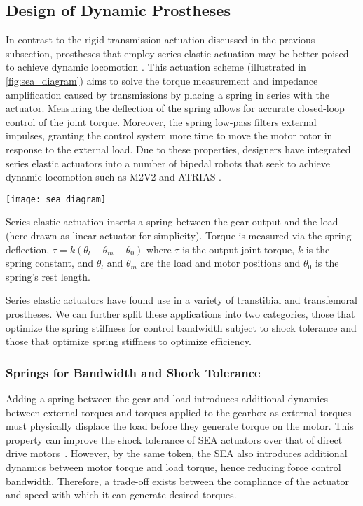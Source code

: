 

\subsection{Design of Dynamic Prostheses}\label{sec:back_dyn_pros}
In contrast to the rigid transmission actuation discussed in the previous
subsection, prostheses that employ series elastic actuation may be better poised
to achieve dynamic locomotion \citep{pratt1995series}. This actuation scheme
(illustrated in \cref{fig:sea_diagram}) aims to solve the torque measurement and
impedance amplification caused by transmissions by placing a spring in series
with the actuator. Measuring the deflection of the spring allows for accurate
closed-loop control of the joint torque. Moreover, the spring low-pass filters
external impulses, granting the control system more time to move the motor rotor
in response to the external load.  Due to these properties, designers have
integrated series elastic actuators into a number of bipedal robots that seek to
achieve dynamic locomotion such as M2V2 \citep{pratt2008design} and ATRIAS
\citep{grimes2013atrias}.
\begin{marginfigure}
    \centering
    \texttt{[image: sea\_diagram]}
    \caption{Series elastic actuation inserts a spring between the gear output
    and the load (here drawn as linear actuator for simplicity). Torque is
    measured via the spring deflection, $\tau = k(\theta_l - \theta_m -
    \theta_0)$ where $\tau$ is the output joint torque, $k$ is the spring
    constant, and $\theta_l$ and $\theta_m$ are the load and motor positions and
    $\theta_0$ is the spring's rest length.}
    \label{fig:sea_diagram}
\end{marginfigure}

Series elastic actuators have found use in a variety of transtibial and
transfemoral prostheses. We can further split these applications into two
categories, those that optimize the spring stiffness for control bandwidth
subject to shock tolerance and those that optimize spring stiffness to optimize
efficiency.

\subsubsection{Springs for Bandwidth and Shock Tolerance}
Adding a spring between the gear and load introduces additional dynamics between
external torques and torques applied to the gearbox as external torques must
physically displace the load before they generate torque on the motor. This
property can improve the shock tolerance of SEA actuators over that of direct
drive motors~\citep{robinson2000design}. However, by the same token, the SEA
also introduces additional dynamics between motor torque and load torque, hence
reducing force control bandwidth. Therefore, a trade-off exists between the
compliance of the actuator and speed with which it can generate desired torques.


